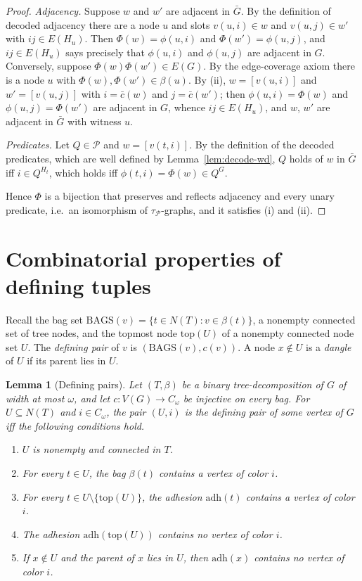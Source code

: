 \documentclass[11pt]{article}
\newtheorem{lemma}[theorem]{Lemma}
\theoremstyle{definition}
\newcommand{\Bags}{\mathrm{BAGS}}
\newcommand{\adh}{\mathrm{adh}}
\newcommand{\topnode}{\mathrm{top}}
\newcommand{\Pred}{\mathcal P}
\begin{document}
\begin{proof}
\emph{Adjacency.}  Suppose \(w\) and \(w'\) are adjacent in \(\bar G\).  By
the definition of decoded adjacency there are a node \(u\) and slots
\(v(u,i)\in w\) and \(v(u,j)\in w'\) with \(ij\in E(H_u)\).  Then
\(\Phi(w)=\phi(u,i)\) and \(\Phi(w')=\phi(u,j)\), and \(ij\in E(H_u)\) says
precisely that \(\phi(u,i)\) and \(\phi(u,j)\) are adjacent in \(G\).
Conversely, suppose \(\Phi(w)\Phi(w')\in E(G)\).  By the edge-coverage axiom
there is a node \(u\) with \(\Phi(w),\Phi(w')\in\beta(u)\).  By (ii),
\(w=[v(u,i)]\) and \(w'=[v(u,j)]\) with \(i=\bar c(w)\) and \(j=\bar c(w')\);
then \(\phi(u,i)=\Phi(w)\) and \(\phi(u,j)=\Phi(w')\) are adjacent in \(G\),
whence \(ij\in E(H_u)\), and \(w\), \(w'\) are adjacent in \(\bar G\) with
witness \(u\).

\emph{Predicates.}  Let \(Q\in\Pred\) and \(w=[v(t,i)]\).  By the definition
of the decoded predicates, which are well defined by
Lemma~\ref{lem:decode-wd}, \(Q\) holds of \(w\) in \(\bar G\) iff
\(i\in Q^{H_t}\), which holds iff \(\phi(t,i)=\Phi(w)\in Q^G\).

Hence \(\Phi\) is a bijection that preserves and reflects adjacency and every
unary predicate, i.e.\ an isomorphism of \(\tau_{\Pred}\)-graphs, and it
satisfies (i) and (ii).
\end{proof}

\section{Combinatorial properties of defining tuples}

Recall the bag set \(\Bags(v)=\{t\in N(T):v\in\beta(t)\}\), a nonempty connected
set of tree nodes, and the topmost node \(\topnode(U)\) of a nonempty connected
node set \(U\).  The \emph{defining pair} of \(v\) is \((\Bags(v),c(v))\).  A node
\(x\notin U\) is a \emph{dangle} of \(U\) if its parent lies in \(U\).

\begin{lemma}[Defining pairs]\label{lem:defining-pairs}
Let \((T,\beta)\) be a binary tree-decomposition of \(G\) of width at most
\(\omega\), and let \(c:V(G)\to C_\omega\) be injective on every bag.  For
\(U\subseteq N(T)\) and \(i\in C_\omega\), the pair \((U,i)\) is the defining pair
of some vertex of \(G\) iff the following conditions hold.
\begin{enumerate}[label=(\roman*)]
  \item \(U\) is nonempty and connected in \(T\).
  \item For every \(t\in U\), the bag \(\beta(t)\) contains a vertex of color \(i\).
  \item For every \(t\in U\setminus\{\topnode(U)\}\), the adhesion \(\adh(t)\)
    contains a vertex of color \(i\).
  \item The adhesion \(\adh(\topnode(U))\) contains no vertex of color \(i\).
  \item If \(x\notin U\) and the parent of \(x\) lies in \(U\), then \(\adh(x)\)
    contains no vertex of color \(i\).
\end{enumerate}
\end{lemma}
\end{document}
